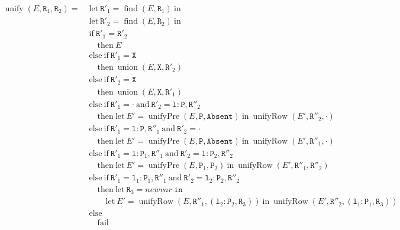 \documentclass{report}
\newcommand{\code}{\mathtt}
\DeclareMathOperator{\union}{union}
\DeclareMathOperator{\find}{find}
\DeclareMathOperator{\unify}{unify}
\DeclareMathOperator{\unifyRow}{unifyRow}
\DeclareMathOperator{\unifyPresence}{unifyPre}
\newcommand{\newVariable}{newvar}
\begin{document}
\begin{align*}
\unify(E, \code{R}_1, \code{R}_2) = \;
& \text{let}\ \code{R}'_1 = \find(E, \code{R}_1)\ \text{in} \\
& \text{let}\ \code{R}'_2 = \find(E, \code{R}_2)\ \text{in} \\
& \text{if}\ \code{R}'_1 = \code{R}'_2 \\
& \quad \text{then}\ E \\
& \text{else}\ \text{if}\ \code{R}'_1 = \code{X} \\
& \quad \text{then}\ \union(E, \code{X}, \code{R}'_2) \\
& \text{else}\ \text{if}\ \code{R}'_2 = \code{X} \\
& \quad \text{then}\ \union(E, \code{X}, \code{R}'_1) \\
& \text{else}\ \text{if}\ \code{R}'_1 = \cdot\ \text{and}\ \code{R}'_2 = \code{l}:\code{P},\code{R}''_2 \\
& \quad \text{then}\ \text{let}\ E' = \unifyPresence(E, \code{P}, \code{Absent})\ \text{in}\ \unifyRow(E', \code{R}''_2, \cdot) \\
& \text{else}\ \text{if}\ \code{R}'_1 = \code{l}:\code{P},\code{R}''_1\ \text{and}\ \code{R}'_2 = \cdot \\
& \quad \text{then}\ \text{let}\ E' = \unifyPresence(E, \code{P}, \code{Absent})\ \text{in}\ \unifyRow(E', \code{R}''_1, \cdot) \\
& \text{else}\ \text{if}\ \code{R}'_1 = \code{l}:\code{P}_1,\code{R}''_1\ \text{and}\ \code{R}'_2 = \code{l}:\code{P}_2,\code{R}''_2 \\
& \quad \text{then}\ \text{let}\ E' = \unifyPresence(E, \code{P}_1, \code{P}_2)\ \text{in}\ \unifyRow(E', \code{R}''_1, \code{R}''_2) \\
& \text{else}\ \text{if}\ \code{R}'_1 = \code{l}_1:\code{P}_1,\code{R}''_1\ \text{and}\ \code{R}'_2 = \code{l}_2:\code{P}_2,\code{R}''_2 \\
& \quad \text{then}\ \text{let}\ \code{R}_3 = \newVariable\ \code{in} \\
& \qquad \text{let}\ E' = \unifyRow(E, \code{R}''_1, (\code{l}_2:\code{P}_2,\code{R}_3))\ \text{in}\ \unifyRow(E', \code{R}''_2, (\code{l}_1:\code{P}_1,\code{R}_3)) \\
& \text{else} \\
& \quad \text{fail}
\end{align*}
\end{document}
